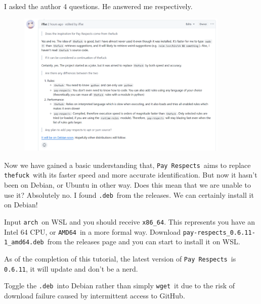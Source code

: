 \documentclass[12pt]{ctexart}
\newenvironment{mdquote}
{%
  \par\noindent
  \begin{list}{}{%
      \setlength{\leftmargin}{1em}%
      \setlength{\rightmargin}{0pt}%
      \setlength{\itemindent}{0pt}%
      \setlength{\listparindent}{\parindent}%
      \setlength{\topsep}{0.5\baselineskip}%
  }
  \item[\textbf{>}\ ]\itshape
}
{\end{list}\par}
\begin{document}
I asked the author 4 questions. He answered me respectively.

\begin{figure}[H]
    \centering
    \includegraphics[width=0.9\textwidth,keepaspectratio]{assets/Linux/2.5 What's the first word when messing up a command/4.png}
\end{figure}

Now we have gained a basic understanding that, \texttt{Pay\ Respects}\
aims to replace \texttt{thefuck}\ with its faster speed and more accurate
identification. But now it hasn't been on Debian, or
Ubuntu in other way. Does this mean that we are unable to use it?
Absolutely no. I found \texttt{.deb}\ from the releases. We can certainly
install it on Debian!

Input \texttt{arch}\ on WSL and you should receive \texttt{x86\_64}. This
represents you have an Intel 64 CPU, or \texttt{AMD64}\ in a more formal
way. Download \texttt{pay-respects\_0.6.11-1\_amd64.deb}\ from the
releases page and you can start to install it on WSL.

\begin{mdquote}
As of the completion of this tutorial, the latest version of
\texttt{Pay\ Respects}\ is \texttt{0.6.11}, it will update and
don't be a nerd.
\end{mdquote}

Toggle the \texttt{.deb}\ into Debian rather than simply \texttt{wget}\ it
due to the risk of download failure caused by intermittent access to
GitHub.
\end{document}
